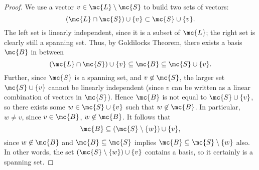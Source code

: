 \documentclass[math1530-lecture-notes]{subfiles}
\begin{document}
\begin{proof}[Proof]
  We use a vector $v\in \mc{L}\setminus \mc{S}$ to build two sets of vectors: \[
    \left( \mc{L}\cap \mc{S} \right)\cup \{ v \} \subset \mc{S}\cup \{ v \}
  .\] The left set is linearly independent, since it is a subset of $\mc{L}$; the right set is
  clearly still a spanning set. Thus, by Goldilocks Theorem, there exists a basis $\mc{B}$ in
  between \[
    \left( \mc{L}\cap \mc{S} \right)\cup \{ v \} \subseteq \mc{B} \subseteq  \mc{S}\cup \{ v \}
  .\] Further, since $\mc{S}$ is a spanning set, and $v\not\in \mc{S}$, the larger set $\mc{S}\cup
  \{ v \}$ cannot be linearly independent (since $v$ can be written as a linear combination of
  vectors in $\mc{S}$). Hence $\mc{B}$ is not equal to $\mc{S}\cup \{ v \}$, so there exists some
  $w\in \mc{S}\cup \{ v \}$ such that $w\not\in \mc{B}$. In particular, $w\neq v$, since $v\in
  \mc{B}$, $w\not\in \mc{B}$. It follows that \[
    \mc{B}\subseteq \left( \mc{S}\setminus \{ w \} \right) \cup \{ v \}
  ,\] since $w\not\in \mc{B}$ and $\mc{B}\subseteq \mc{S}$ implies $\mc{B}\subseteq \mc{S}\setminus
  \{ w \}$ also. In other words, the set $\left( \mc{S}\setminus \{ w \} \right) \cup \{ v \}$
  contains a basis, so it certainly is a spanning set.
\end{proof}
\end{document}
